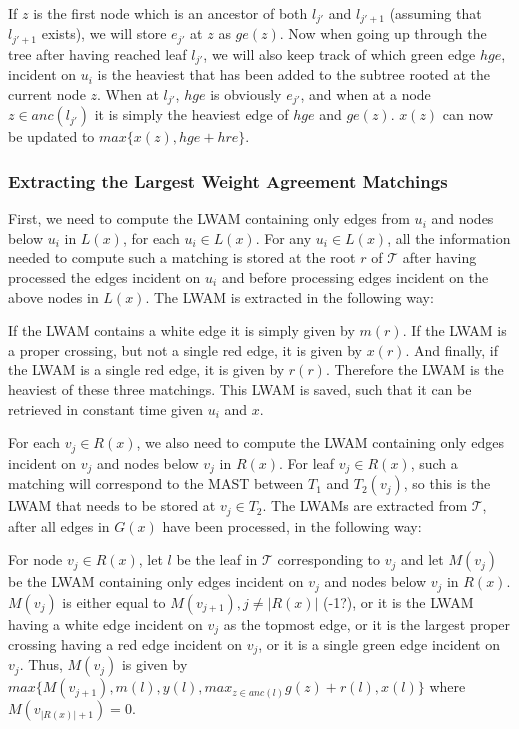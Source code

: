 If $z$ is the first node which is an ancestor of both $l_{j'}$ and $l_{j'+1}$ (assuming that $l_{j'+1}$ exists), we will store $e_{j'}$ at $z$ as $ge(z)$. Now when going up through the tree after having reached leaf $l_{j'}$, we will also keep track of which green edge $hge$, incident on $u_i$ is the heaviest that has been added to the subtree rooted at the current node $z$. When at $l_{j'}$, $hge$ is obviously $e_{j'}$, and when at a node $z \in anc(l_{j'})$ it is simply the heaviest edge of $hge$ and $ge(z)$. $x(z)$ can now be updated to $max\{x(z), hge + hre\}$.

\subsubsection{Extracting the Largest Weight Agreement Matchings}
First, we need to compute the LWAM containing only edges from $u_i$ and nodes below $u_i$ in $L(x)$, for each $u_i \in L(x)$. For any $u_i \in L(x)$, all the information needed to compute such a matching is stored at the root $r$ of $\mathcal{T}$ after having processed the edges incident on $u_i$ and before processing edges incident on the above nodes in $L(x)$. The LWAM is extracted in the following way:

If the LWAM contains a white edge it is simply given by $m(r)$. If the LWAM is a proper crossing, but not a single red edge, it is given by $x(r)$. And finally, if the LWAM is a single red edge, it is given by $r(r)$. Therefore the LWAM is the heaviest of these three matchings. This LWAM is saved, such that it can be retrieved in constant time given $u_i$ and $x$. 

For each $v_j \in R(x)$, we also need to compute the LWAM containing only edges incident on $v_j$ and nodes below $v_j$ in $R(x)$. For leaf $v_j \in R(x)$, such a matching will correspond to the MAST between $T_1$ and $T_2(v_j)$, so this is the LWAM that needs to be stored at $v_j \in T_2$. The LWAMs are extracted from $\mathcal{T}$, after all edges in $G(x)$ have been processed, in the following way:

For node $v_j \in R(x)$, let $l$ be the leaf in $\mathcal{T}$ corresponding to $v_j$ and let $M(v_j)$ be the LWAM containing only edges incident on $v_j$ and nodes below $v_j$ in $R(x)$. $M(v_j)$ is either equal to $M(v_{j+1}), j \ne |R(x)|$ (-1?), or it is the LWAM having a white edge incident on $v_j$ as the topmost edge, or it is the largest proper crossing having a red edge incident on $v_j$, or it is a single green edge incident on $v_j$. Thus, $M(v_j)$ is given by $max\{M(v_{j+1}), m(l), y(l), max_{z \in anc(l)}g(z) + r(l), x(l)\}$ where $M(v_{|R(x)|+1}) = 0$.

